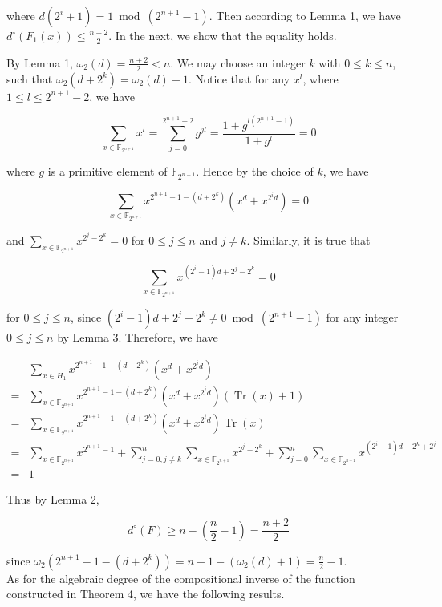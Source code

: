 \documentclass[10pt]{article}
\begin{document}
where $d\left(2^{i}+1\right)=1 \bmod \left(2^{n+1}-1\right)$. Then according to Lemma 1, we have $d^{\circ}\left(F_{1}(x)\right) \leq \frac{n+2}{2}$. In the next, we show that the equality holds.

By Lemma 1, $\omega_{2}(d)=\frac{n+2}{2}<n$. We may choose an integer $k$ with $0 \leq k \leq n$, such that $\omega_{2}\left(d+2^{k}\right)=\omega_{2}(d)+1$. Notice that for any $x^{l}$, where $1 \leq l \leq 2^{n+1}-2$, we have

$$
\sum_{x \in \mathbb{F}_{2^{n+1}}} x^{l}=\sum_{j=0}^{2^{n+1}-2} g^{j l}=\frac{1+g^{l\left(2^{n+1}-1\right)}}{1+g^{l}}=0
$$

where $g$ is a primitive element of $\mathbb{F}_{2^{n+1}}$. Hence by the choice of $k$, we have

$$
\sum_{x \in \mathbb{F}_{2^{n+1}}} x^{2^{n+1}-1-\left(d+2^{k}\right)}\left(x^{d}+x^{2^{i} d}\right)=0
$$

and $\sum_{x \in \mathbb{F}_{2^{n+1}}} x^{2^{j}-2^{k}}=0$ for $0 \leq j \leq n$ and $j \neq k$. Similarly, it is true that

$$
\sum_{x \in \mathbb{F}_{2^{n+1}}} x^{\left(2^{i}-1\right) d+2^{j}-2^{k}}=0
$$

for $0 \leq j \leq n$, since $\left(2^{i}-1\right) d+2^{j}-2^{k} \neq 0 \bmod \left(2^{n+1}-1\right)$ for any integer $0 \leq j \leq n$ by Lemma 3. Therefore, we have

$$
\begin{aligned}
& \sum_{x \in H_{1}} x^{2^{n+1}-1-\left(d+2^{k}\right)}\left(x^{d}+x^{2^{i} d}\right) \\
= & \sum_{x \in \mathbb{F}_{2^{n+1}}} x^{2^{n+1}-1-\left(d+2^{k}\right)}\left(x^{d}+x^{2^{i} d}\right)(\operatorname{Tr}(x)+1) \\
= & \sum_{x \in \mathbb{F}_{2^{n+1}}} x^{2^{n+1}-1-\left(d+2^{k}\right)}\left(x^{d}+x^{2^{i} d}\right) \operatorname{Tr}(x) \\
= & \sum_{x \in \mathbb{F}_{2^{n+1}}} x^{2^{n+1}-1}+\sum_{j=0, j \neq k}^{n} \sum_{x \in \mathbb{F}_{2^{n+1}}} x^{2^{j}-2^{k}}+\sum_{j=0}^{n} \sum_{x \in \mathbb{F}_{2^{n+1}}} x^{\left(2^{i}-1\right) d-2^{k}+2^{j}} \\
= & 1
\end{aligned}
$$

Thus by Lemma 2,

$$
d^{\circ}(F) \geq n-\left(\frac{n}{2}-1\right)=\frac{n+2}{2}
$$

since $\omega_{2}\left(2^{n+1}-1-\left(d+2^{k}\right)\right)=n+1-\left(\omega_{2}(d)+1\right)=\frac{n}{2}-1$.\\
As for the algebraic degree of the compositional inverse of the function constructed in Theorem 4, we have the following results.
\end{document}
